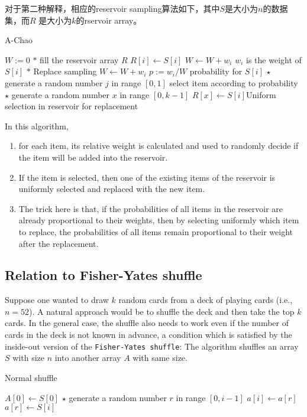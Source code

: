 对于第二种解释，相应的reservoir sampling算法如下，其中$S$是大小为$n$的数据集，而$R$ 是大小为$k$的rservoir array。
\begin{algorithm}[H]
\caption{A-Chao}
\begin{algorithmic}[1]
\State $W:=0$
\State $\ast$ fill the reservoir array $R$
\State $R[i]\gets S[i]$
\State $W\gets W + w_i$ \Comment $w_i$ is the weight of $S[i]$
\EndFor
\State $\ast$ Replace sampling
\State $ W\gets W+w_i $
\State $p:=w_i/W$ \Comment probability for $S[i]$
\State $\star$ generate a random number $j$ in range $[0, 1]$
 \Comment select item according to probability
\State $\star$ generate a random number $x$ in range $[0,k-1]$
\State $R[x]\gets S[i]$\Comment Uniform selection in reservoir for replacement
\EndIf
\EndFor
\EndProcedure
\end{algorithmic}
\end{algorithm}
In this algorithm, 
\begin{enumerate}
\item for each item, its relative weight is calculated and used to randomly decide if the item will be added into the reservoir.
\item If the item is selected, then one of the existing items of the reservoir is uniformly selected and replaced with the new item.
\item The trick here is that, if the probabilities of all items in the reservoir are already proportional to their weights, then by selecting uniformly which item to replace, the probabilities of all items remain proportional to their weight after the replacement. 
\end{enumerate}

\subsection{Relation to Fisher-Yates shuffle}
Suppose one wanted to draw $ k $ random cards from a deck of playing cards (i.e., $ n=52 $). A natural approach would be to shuffle the deck and then take the top $ k $ cards. In the general case, the shuffle also needs to work even if the number of cards in the deck is not known in advance, a condition which is satisfied by the inside-out version of the \texttt{Fisher-Yates shuffle}: The algorithm shuffles an array $S$ with size $n$ into another array $A$ with same size.
\begin{algorithm}[H]
\caption{Normal shuffle}
\begin{algorithmic}[1]
\State $A[0]\gets S[0]$
\State $\star$ generate a random number $r$ in range $[0, i-1]$
\State $a[i]\gets a[r]$
\State $a[r]\gets S[i]$
\EndFor
\EndProcedure
\end{algorithmic}
\end{algorithm}

